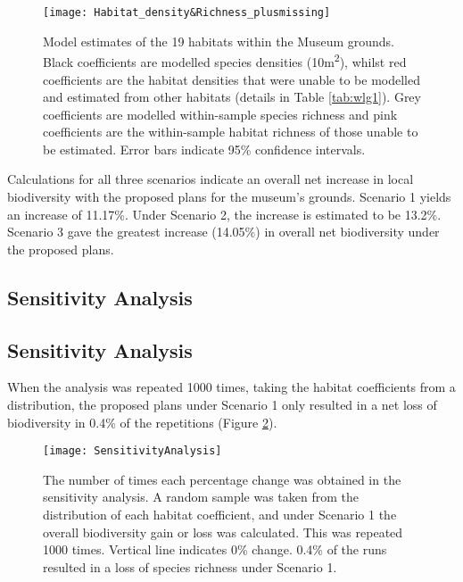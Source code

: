 \begin{figure}[t]
	\centering
	\texttt{[image: Habitat\_density\&Richness\_plusmissing]}
	\caption{Model estimates of the 19 habitats within the Museum grounds. Black coefficients are modelled species densities (10m\textsuperscript{2}), whilst red coefficients are the habitat densities that were unable to be modelled and estimated from other habitats (details in Table \ref{tab:wlg1}). Grey coefficients are modelled within-sample species richness and pink coefficients are the within-sample habitat richness of those unable to be estimated. Error bars indicate 95\% confidence intervals.}
   	 \label{fig:wlgmodel}
\end{figure}
	
Calculations for all three scenarios indicate an overall net increase in local biodiversity with the proposed plans for the museum's grounds. Scenario 1 yields an increase of 11.17\%. Under Scenario 2, the increase is estimated to be 13.2\%. Scenario 3 gave the greatest increase (14.05\%) in overall net biodiversity under the proposed plans.

\ifappendixStyle %
\subsection{Sensitivity Analysis}%
\else
\subsection*{Sensitivity Analysis}
\fi

When the analysis was repeated 1000 times, taking the habitat coefficients from a distribution, the proposed plans under Scenario 1 only resulted in a net loss of biodiversity in 0.4\% of the repetitions (Figure \ref{fig:wlgsensitivity}).

\begin{figure}[t]
	\centering
	\texttt{[image: SensitivityAnalysis]}
	\caption{The number of times each percentage change was obtained in the sensitivity analysis. A random sample was taken from the distribution of each habitat coefficient, and under Scenario 1 the overall biodiversity gain or loss was calculated. This was repeated 1000 times. Vertical line indicates 0\% change. 0.4\% of the runs resulted in a loss of species richness under Scenario 1.}
   	 \label{fig:wlgsensitivity}
\end{figure}

\ifappendixStyle %
